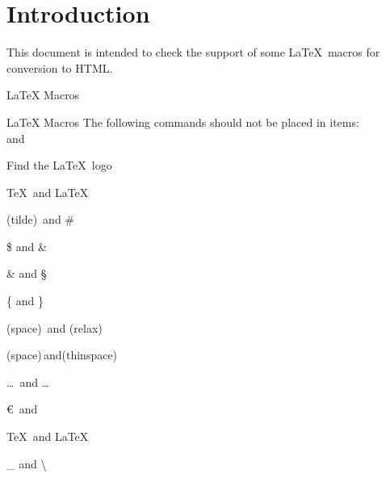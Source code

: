 \documentclass{article}
\begin{document}
\section*{Introduction}

This document is intended to check the support of some \LaTeX\ macros for 
conversion to HTML.

\begin{quiz}[points=1]{LaTeX Macros}
\begin{multi}{LaTeX Macros}
The following commands should not be placed in items: \\ and \par
Find the \LaTeX\ logo
\item* \TeX\ and \LaTeX
\item (tilde)~and \#
\item \$ and \&
\item \& and \S
\item \{ and \}
\item (space)\ and \relax (relax)
\item (space)\,and\thinspace(thinspace)
\item \dots\ and \ldots
\item \euro\ and \texteuro
\item \TeX\ and \LaTeX
\item \_ and \textbackslash
\end{multi}

\end{quiz}
\end{document}
